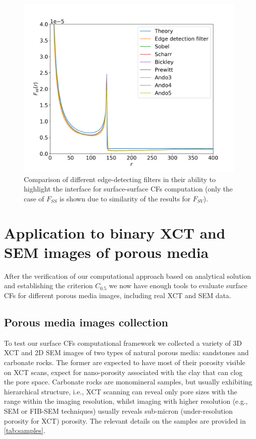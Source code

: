 \documentclass[reprint,amsmath,amssymb,aps,pre,showkeys,showpacs]{revtex4-1}
\begin{document}
\begin{figure}[ht]
  \centering \includegraphics[width=\linewidth]{images/kernels.png}
  \caption{Comparison of different edge-detecting filters in their ability to
    highlight the interface for surface-surface CFs computation (only the case
    of $F_{SS}$ is shown due to similarity of the results for
    $F_{SV}$).}
  \label{fig:kernels}
\end{figure}

\section{Application to binary XCT and SEM images of porous media}
\label{sec:application}
After the verification of our computational approach based on analytical
solution and establishing the criterion $C_{0.5}$ we now have enough tools to
evaluate surface CFs for different porous media images, including real XCT and
SEM data.

\subsection{Porous media images collection}
To test our surface CFs computational framework we collected a variety of 3D XCT
and 2D SEM images of two types of natural porous media: sandstones and carbonate
rocks. The former are expected to have most of their porosity visible on XCT
scans, expect for nano-porosity associated with the clay that can clog the pore
space. Carbonate rocks are monomineral samples, but usually exhibiting
hierarchical structure, i.e., XCT scanning can reveal only pore sizes with the
range within the imaging resolution, whilst imaging with higher resolution
(e.g., SEM or FIB-SEM techniques) usually reveals sub-micron (under-resolution
porosity for XCT) porosity. The relevant details on the samples are provided in
\cref{tab:samples}.
\end{document}

